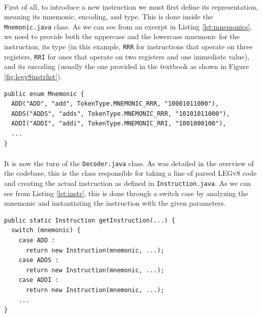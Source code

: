 \paragraph{}
First of all, to introduce a new instruction we must first define its representation, meaning its mnemonic, encoding, and type. This is done inside the \verb|Mnemonic.java| class. As we can see from an excerpt in Listing \ref{lst:mnemonics}, we need to provide both the uppercase and the lowercase mnemonic for the instruction, its type (in this example, \verb|RRR| for instructions that operate on three registers, \verb|RRI| for ones that operate on two registers and one immediate value), and its encoding (usually the one provided in the textbook \cite{patterson2016computer} as shown in Figure \ref{fig:legv8instrlist}).
\begin{lstlisting}[float, caption={How mnemonics are defined}, label={lst:mnemonics}]
public enum Mnemonic {
  ADD("ADD", "add", TokenType.MNEMONIC_RRR, "10001011000"),
  ADDS("ADDS", "adds", TokenType.MNEMONIC_RRR, "10101011000"),
  ADDI("ADDI", "addi", TokenType.MNEMONIC_RRI, "1001000100"),
  ...
}
\end{lstlisting}
\paragraph{}
It is now the turn of the \verb|Decoder.java| class. As was detailed in the overview of the codebase, this is the class responsible for taking a line of parsed LEGv8 code and creating the actual instruction as defined in \verb|Instruction.java|. As we can see from Listing \ref{lst:instr}, this is done through a switch case by analyzing the mnemonic and instantiating the instruction with the given parameters.
\begin{lstlisting}[float, caption={The creation of instructions}, label={lst:instr}]
public static Instruction getInstruction(...) {
  switch (mnemonic) {
    case ADD :
      return new Instruction(mnemonic, ...);
    case ADDS :
      return new Instruction(mnemonic, ...);
    case ADDI :
      return new Instruction(mnemonic, ...);
    ...
}
\end{lstlisting}
